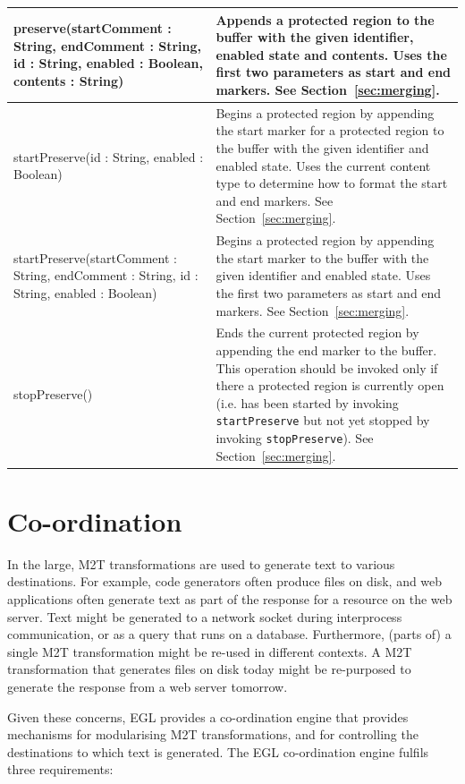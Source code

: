 \begin{longtable} {|p{5.5cm}|p{6.5cm}|}
			preserve(startComment : String, endComment : String, id : String, enabled : Boolean, contents : String) & Appends a protected region to the buffer with the given identifier, enabled state and contents. Uses the first two parameters as start and end markers. See Section~\ref{sec:merging}. \\\hline
			
			startPreserve(id : String, enabled : Boolean) & Begins a protected region by appending the start marker for a protected region to the buffer with the given identifier and enabled state. Uses the current content type to determine how to format the start and end markers. See Section~\ref{sec:merging}. \\\hline
			
			startPreserve(startComment : String, endComment : String, id : String, enabled : Boolean) & Begins a protected region by appending the start marker to the buffer with the given identifier and enabled state. Uses the first two parameters as start and end markers. See Section~\ref{sec:merging}. \\\hline
			
			stopPreserve() & Ends the current protected region by appending the end marker to the buffer. This operation should be invoked only if there a protected region is currently open (i.e. has been started by invoking \texttt{st\-a\-rtPr\-es\-er\-ve} but not yet stopped by invoking \texttt{st\-opPr\-es\-er\-ve}). See Section~\ref{sec:merging}. \\\hline
\end{longtable}

\section{Co-ordination}
\label{Co-ordination}
In the large, M2T transformations are used to generate text to various
destinations. For example, code generators often produce files on disk, 
and web applications often generate text as part of the response for a 
resource on the web server. Text might be generated to a network socket
during interprocess communication, or as a query that runs on a database.
Furthermore, (parts of) a single M2T transformation might be re-used in 
different contexts. A M2T transformation that generates files on disk today 
might be re-purposed to generate the response from a web server tomorrow.  

Given these concerns, EGL provides a co-ordination engine that provides
mechanisms for modularising M2T transformations, and for controlling the
destinations to which text is generated. The EGL co-ordination engine 
fulfils three requirements:

